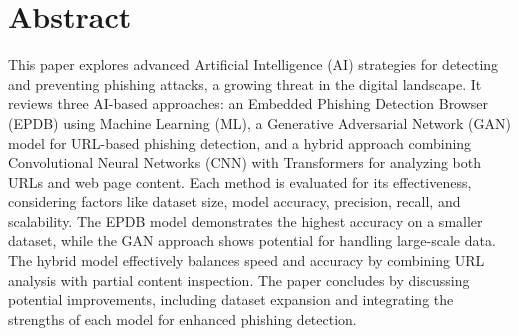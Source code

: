 \chapter*{Abstract}
This paper explores advanced Artificial Intelligence (AI) strategies for detecting and preventing phishing attacks, a growing threat in the digital landscape. It reviews three AI-based approaches: an Embedded Phishing Detection Browser (EPDB) using Machine Learning (ML), a Generative Adversarial Network (GAN) model for URL-based phishing detection, and a hybrid approach combining Convolutional Neural Networks (CNN) with Transformers for analyzing both URLs and web page content. Each method is evaluated for its effectiveness, considering factors like dataset size, model accuracy, precision, recall, and scalability. The EPDB model demonstrates the highest accuracy on a smaller dataset, while the GAN approach shows potential for handling large-scale data. The hybrid model effectively balances speed and accuracy by combining URL analysis with partial content inspection. The paper concludes by discussing potential improvements, including dataset expansion and integrating the strengths of each model for enhanced phishing detection.